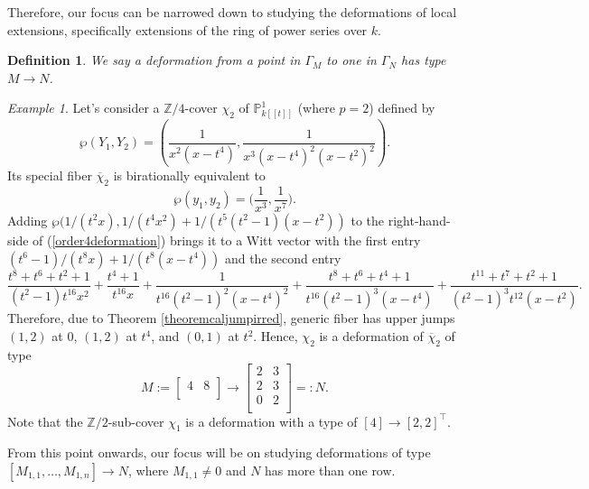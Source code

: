 \documentclass{compositio}
\newtheorem{definition}[theorem]{Definition}
\theoremstyle{remark}
\newtheorem{example}[theorem]{Example}
\theoremstyle{remark}
\begin{document}
Therefore, our focus can be narrowed down to studying the deformations of local extensions, specifically extensions of the ring of power series over $k$.




\begin{definition}
    We say a deformation from a point in $\Gamma_{M}$ to one in $\Gamma_{N}$  has \emph{type} $M \xrightarrow{} N$.
\end{definition}



\begin{example}
\label{examplenonossdeformation}
Let's consider a $\mathbb{Z}/4$-cover $\chi_2$ of $\mathbb{P}^1_{k[[t]]}$ (where $p=2$) defined by
\begin{equation}
\label{order4deformation}
\wp(Y_1,Y_2)=\left(\frac{1}{x^2(x-t^4)}, \frac{1}{x^3(x-t^4)^2(x-t^2)^2}\right).
\end{equation}
Its special fiber $\overline{\chi}_2$ is birationally equivalent to
\[ \wp(y_1,y_2)=\bigg( \frac{1}{x^3}, \frac{1}{x^7} \bigg). \]
Adding $\wp(1/(t^2x), 1/(t^4x^2)+ 1/(t^5(t^2-1)(x-t^2))$ to the right-hand-side of (\ref{order4deformation}) brings it to a Witt vector with the first entry $(t^6-1)/(t^8x)+1/(t^8(x-t^4))$ and the second entry
\begin{equation*}
    \frac{t^8+t^6+t^2+1}{(t^2-1)t^{16}x^2}+ \frac{t^4+1}{t^{16}x}+\frac{1}{t^{16}(t^2-1)^2(x-t^4)^2} + \frac{t^8+t^6+t^4+1}{t^{16}(t^2-1)^3(x-t^4)}+\frac{t^{11}+t^7+t^2+1}{(t^2-1)^3t^{12}(x-t^2)}.
\end{equation*}
Therefore, due to Theorem \ref{theoremcaljumpirred}, generic fiber has upper jumps $(1,2)$ at $0$, $(1,2)$ at $t^4$, and $(0,1)$ at $t^2$. Hence, $\chi_2$ is a deformation of $\overline{\chi}_2$ of type
\[M:= \begin{bmatrix}
4 & 8 \\
\end{bmatrix} \xrightarrow{}  \begin{bmatrix}
   2 & 3 \\
   2 & 3 \\
   0 & 2\\
   \end{bmatrix}=:N. \] 
Note that the $\mathbb{Z}/2$-sub-cover $\chi_1$ is a deformation with a type of $[4] \to [2,2]^{\top}$. 
\end{example}


From this point onwards, our focus will be on studying deformations of type $[M_{1,1}, \ldots, M_{1, n}] \to N$, where $M_{1,1} \neq 0$ and $N$ has more than one row. 
\end{document}
